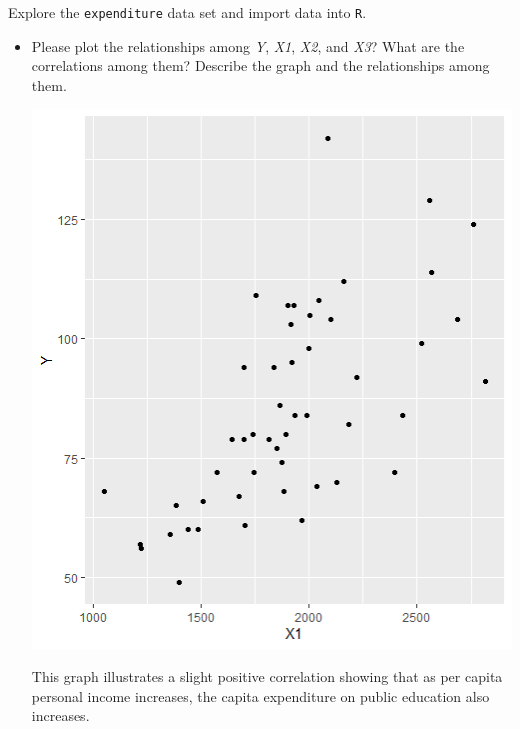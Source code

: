 \documentclass[12pt,letterpaper]{article}
\begin{document}
\vspace{.5cm}
\noindent Explore the \texttt{expenditure} data set and import data into \texttt{R}.
\vspace{.5cm}
  
\vspace{.5cm}
\begin{itemize}

\item
Please plot the relationships among \emph{Y}, \emph{X1}, \emph{X2}, and \emph{X3}? What are the correlations among them? Describe the graph and the relationships among them.
\vspace{.5cm}



\includegraphics{Y vs X1}

This graph illustrates a slight positive correlation showing that as per capita personal income increases, the capita expenditure on public education also increases. 




\end{itemize}
\end{document}
